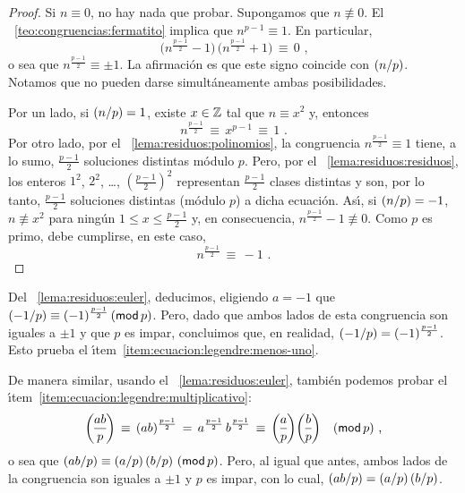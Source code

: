 \begin{proof}
	Si $n\equiv 0$, no hay nada que probar. Supongamos que $n\not\equiv 0$.
	El \teoname~\ref{teo:congruencias:fermatito} implica que
	$n^{p-1}\equiv 1$. En particular,
	\begin{displaymath}
		\big(n^{\frac{p-1} 2}-1\big)\,
		\big(n^{\frac{p-1} 2}+1\big)\,\equiv\,0
		\text{ ,}
	\end{displaymath}
	o sea que $n^{\frac{p-1} 2}\equiv\pm 1$. La afirmaci\'on es que este
	signo coincide con $\tlegendre n p$. Notamos que no pueden darse
	simult\'aneamente ambas posibilidades.

	Por un lado, si $\tlegendre n p=1$, existe $x\in\Enteros$ tal que
	$n\equiv x^2$ y, entonces
	\begin{displaymath}
		n^{\frac{p-1} 2}\,\equiv\,x^{p-1}\,\equiv\,1
		\text{ .}
	\end{displaymath}
	Por otro lado, por el \lemaname~\ref{lema:residuos:polinomios}, la
	congruencia $n^{\frac{p-1} 2}\equiv 1$ tiene, a lo sumo,
	$\frac{p-1} 2$ soluciones distintas m\'odulo $p$. Pero, por el
	\lemaname~\ref{lema:residuos:residuos}, los enteros
	$1^2$, $2^2$, \dots, $(\tfrac{p-1} 2)^2$ representan $\frac{p-1} 2$
	clases distintas y son, por lo tanto, $\frac{p-1} 2$ soluciones
	distintas (m\'odulo $p$) a dicha ecuaci\'on.
	As\'{\i}, si $\tlegendre n p=-1$, $n\not\equiv x^2$ para ning\'un
	$1\leq x\leq\frac{p-1} 2$ y, en consecuencia,
	$n^{\frac{p-1} 2}-1\not\equiv 0$. Como $p$ es primo, debe cumplirse,
	en este caso,
	\begin{displaymath}
		n^{\frac{p-1} 2}\,\equiv\,-1
		\text{ .}
	\end{displaymath}
\end{proof}

Del \lemaname~\ref{lema:residuos:euler}, deducimos, eligiendo $a=-1$ que
$\tlegendre{-1} p\equiv(-1)^{\frac{p-1} 2}\tmodulo[p]$. Pero, dado que
ambos lados de esta congruencia son iguales a $\pm 1$ y que $p$ es impar,
concluimos que, en realidad, $\tlegendre{-1} p=(-1)^{\frac{p-1} 2}$. Esto
prueba el \'{\i}tem~\eqref{item:ecuacion:legendre:menos-uno}.

De manera similar, usando el \lemaname~\ref{lema:residuos:euler}, tambi\'en
podemos probar el \'{\i}tem~\eqref{item:ecuacion:legendre:multiplicativo}:
\begin{displaymath}
	\legendre{ab} p\,\equiv\,(ab)^{\frac{p-1} 2}\,=\,
		a^{\frac{p-1} 2}\,b^{\frac{p-1} 2}\,\equiv\,
		\legendre a p\legendre b p\modulo[p]
	\text{ ,}
\end{displaymath}
%
o sea que $\tlegendre{ab} p\equiv\tlegendre a p\tlegendre b p\tmodulo[p]$.
Pero, al igual que antes, ambos lados de la congruencia son iguales a $\pm 1$
y $p$ es impar, con lo cual, $\tlegendre{ab} p=\tlegendre a p\tlegendre b p$.


